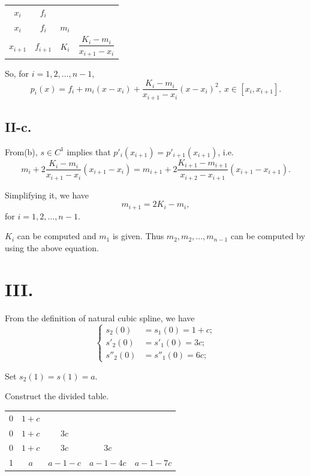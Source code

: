 \documentclass[a4paper]{article}
\begin{document}
\begin{table}[!htbp]
  \centering
  \begin{tabular}{c|ccc}
    $x_i$ & $f_i$ & &  \\
    $x_i$ & $f_i$ & $m_i$ &   \\
    $x_{i+1}$ & $f_{i+1}$ & $K_i$ & $\dfrac{K_i-m_i}{x_{i+1}-x_i}$  \\
  \end{tabular}
\end{table}

So, for $i=1,2,\ldots,n-1$, 
$$p_{i}(x)=f_i+m_i(x-x_i)+\dfrac{K_i-m_i}{x_{i+1}-x_i}(x-x_i)^2,\ x\in[x_i,x_{i+1}].$$

\subsection*{II-c.}
From(b), $s\in C^1$ implies that $p'_{i}(x_{i+1})=p'_{i+1}(x_{i+1})$, i.e. 
$$m_i+2\dfrac{K_i-m_i}{x_{i+1}-x_i}(x_{i+1}-x_i) = m_{i+1}+2\dfrac{K_{i+1}-m_{i+1}}{x_{i+2}-x_{i+1}}(x_{i+1}-x_{i+1}).$$

Simplifying it, we have
$$m_{i+1}=2K_i-m_i,$$
for $i=1,2,\ldots,n-1$.

$K_i$ can be computed and $m_1$ is given. Thus $m_{2},m_{2},\ldots,m_{n-1}$ can be computed by using the above equation.

\section*{III.}
From the definition of natural cubic spline, we have
$$
  \left\{\begin{aligned}
    s_2(0)&=s_1(0)=1+c; \\
    s'_2(0)&=s'_1(0)=3c; \\
    s''_2(0)&=s''_1(0)=6c; 
  \end{aligned}
  \right.
$$

Set $s_2(1)=s(1)=a$.

Construct the divided table.

\begin{table}[!htbp]
  \centering
  \begin{tabular}{c|cccc}
    
    0 & $1+c$ & & & \\
    0 & $1+c$ & $3c$ & &  \\
    0 & $1+c$ & $3c$ & $3c$ & \\
    1 & $a$ &$a-1-c$ & $a-1-4c$ & $a-1-7c$ \\
  \end{tabular}
\end{table}
\end{document}

